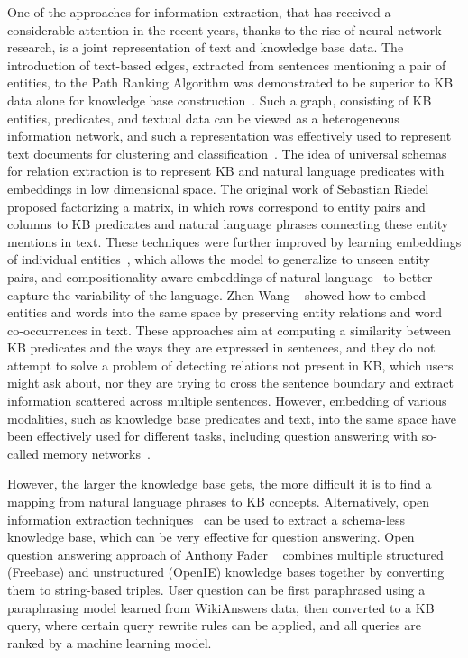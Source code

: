 One of the approaches for information extraction, that has received a considerable attention in the recent years, thanks to the rise of neural network research, is a joint representation of text and knowledge base data.
The introduction of text-based edges, extracted from sentences mentioning a pair of entities, to the Path Ranking Algorithm was demonstrated to be superior to KB data alone for knowledge base construction~\cite{lao2012reading}.
Such a graph, consisting of KB entities, predicates, and textual data can be viewed as a heterogeneous information network, and such a representation was effectively used to represent text documents for clustering and classification~\cite{wang2015incorporating,wang2016text}.
The idea of universal schemas for relation extraction is to represent KB and natural language predicates with embeddings in low dimensional space.
The original work of Sebastian Riedel \etal~\cite{riedel2013relation} proposed factorizing a matrix, in which rows correspond to entity pairs and columns to KB predicates and natural language phrases connecting these entity mentions in text.
These techniques were further improved by learning embeddings of individual entities~\cite{verga2016row}, which allows the model to generalize to unseen entity pairs, and compositionality-aware embeddings of natural language~\cite{toutanova2015representing} to better capture the variability of the language.
Zhen Wang \etal~\cite{wang2014knowledge} showed how to embed entities and words into the same space by preserving entity relations and word co-occurrences in text.
These approaches aim at computing a similarity between KB predicates and the ways they are expressed in sentences, and they do not attempt to solve a problem of detecting relations not present in KB, which users might ask about, nor they are trying to cross the sentence boundary and extract information scattered across multiple sentences.
However, embedding of various modalities, such as knowledge base predicates and text, into the same space have been effectively used for different tasks, including question answering with so-called memory networks~\cite{bordes2015large,miller2016key}.

However, the larger the knowledge base gets, the more difficult it is to find a mapping from natural language phrases to KB concepts.
Alternatively, open information extraction techniques~\cite{Etzioni:2008:OIE:1409360.1409378} can be used to extract a schema-less knowledge base, which can be very effective for question answering.
Open question answering approach of Anthony Fader \etal~\cite{Fader:2014:OQA:2623330.2623677,yin2015answering} combines multiple structured (Freebase) and unstructured (OpenIE) knowledge bases together by converting them to string-based triples.
User question can be first paraphrased using a paraphrasing model learned from WikiAnswers data, then converted to a KB query, where certain query rewrite rules can be applied, and all queries are ranked by a machine learning model.

